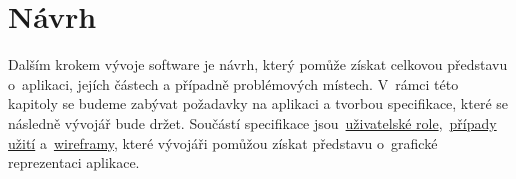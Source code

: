 \chapter{Návrh}
\label{ch:design}
Dalším krokem vývoje software je návrh, který pomůže získat celkovou představu o~aplikaci, jejích částech a případně problémových místech. V~rámci této kapitoly se budeme zabývat požadavky na aplikaci a tvorbou specifikace, které se následně vývojář bude držet. Součástí specifikace jsou~\hyperref[sc:user_roles]{uživatelské role},~\hyperref[sc:use_cases]{případy užití} a~\hyperref[sc:wireframes]{wireframy}, které vývojáři pomůžou získat představu o~grafické reprezentaci aplikace.











